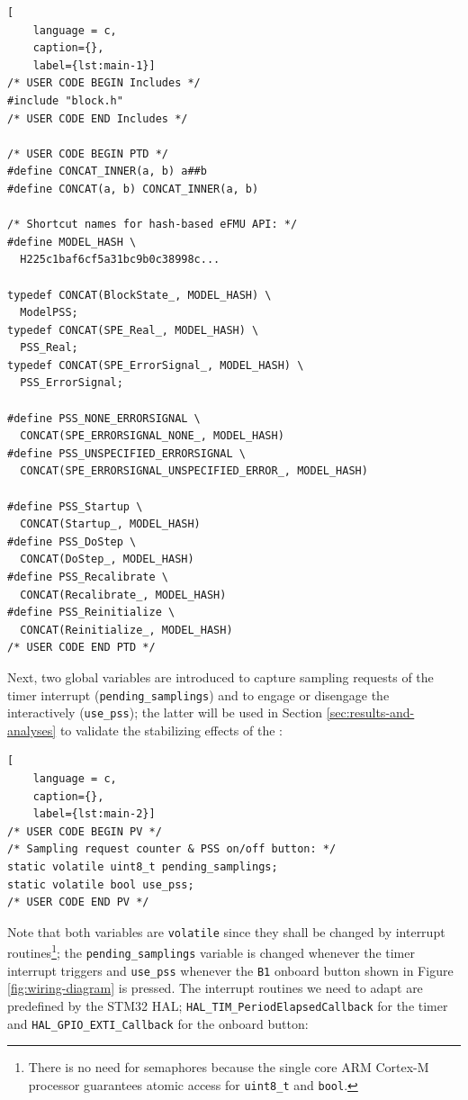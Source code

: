 \begin{lstlisting}[
    language = c,
    caption={},
    label={lst:main-1}]
/* USER CODE BEGIN Includes */
#include "block.h"
/* USER CODE END Includes */

/* USER CODE BEGIN PTD */
#define CONCAT_INNER(a, b) a##b
#define CONCAT(a, b) CONCAT_INNER(a, b)

/* Shortcut names for hash-based eFMU API: */
#define MODEL_HASH \
  H225c1baf6cf5a31bc9b0c38998c...

typedef CONCAT(BlockState_, MODEL_HASH) \
  ModelPSS;
typedef CONCAT(SPE_Real_, MODEL_HASH) \
  PSS_Real;
typedef CONCAT(SPE_ErrorSignal_, MODEL_HASH) \
  PSS_ErrorSignal;

#define PSS_NONE_ERRORSIGNAL \
  CONCAT(SPE_ERRORSIGNAL_NONE_, MODEL_HASH)
#define PSS_UNSPECIFIED_ERRORSIGNAL \
  CONCAT(SPE_ERRORSIGNAL_UNSPECIFIED_ERROR_, MODEL_HASH)

#define PSS_Startup \
  CONCAT(Startup_, MODEL_HASH)
#define PSS_DoStep \
  CONCAT(DoStep_, MODEL_HASH)
#define PSS_Recalibrate \
  CONCAT(Recalibrate_, MODEL_HASH)
#define PSS_Reinitialize \
  CONCAT(Reinitialize_, MODEL_HASH)
/* USER CODE END PTD */
\end{lstlisting}

\noindent{}Next, two global variables are introduced to capture sampling requests of the timer interrupt (\texttt{pending\_samplings}) and to engage or disengage the \controller{} interactively (\texttt{use\_pss}); the latter will be used in Section \ref{sec:results-and-analyses} to validate the stabilizing effects of the \controller{}:

\begin{lstlisting}[
    language = c,
    caption={},
    label={lst:main-2}]
/* USER CODE BEGIN PV */
/* Sampling request counter & PSS on/off button: */
static volatile uint8_t pending_samplings;
static volatile bool use_pss;
/* USER CODE END PV */
\end{lstlisting}

\noindent{}Note that both variables are \texttt{volatile} since they shall be changed by interrupt routines\footnote{There is no need for semaphores because the single core ARM Cortex-M processor guarantees atomic access for \texttt{uint8\_t} and \texttt{bool}.}; the \texttt{pending\_samplings} variable is changed whenever the timer interrupt triggers and \texttt{use\_pss} whenever the \texttt{B1} onboard button shown in Figure \ref{fig:wiring-diagram} is pressed. The interrupt routines we need to adapt are predefined by the STM32 HAL; \texttt{HAL\_TIM\_PeriodElapsedCallback} for the timer and \texttt{HAL\_GPIO\_EXTI\_Callback} for the onboard button:

